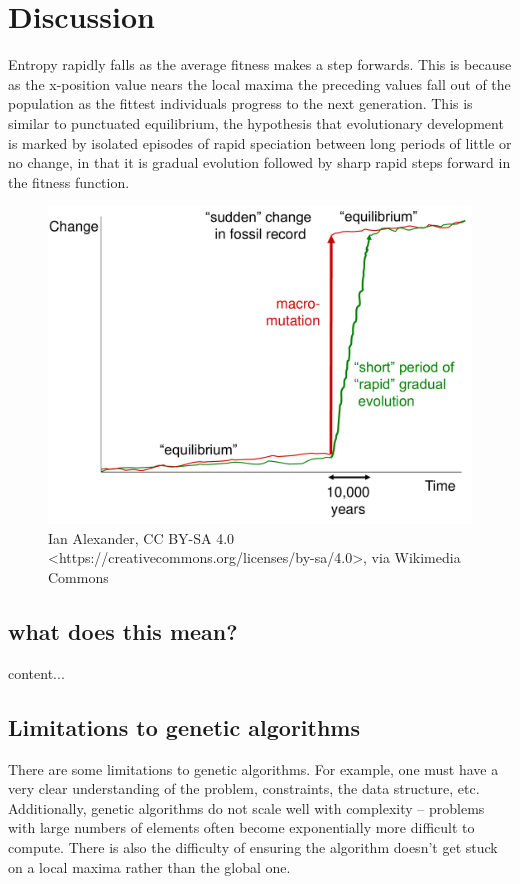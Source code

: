 \documentclass[11pt]{article}
\begin{document}
\section{Discussion}
\label{sec:org7999995}
Entropy rapidly falls as the average fitness makes a step forwards. This is because as the x-position value nears the local maxima the preceding values fall out of the population as the fittest individuals progress to the next generation. This is similar to punctuated equilibrium, the hypothesis that evolutionary development is marked by isolated episodes of rapid speciation between long periods of little or no change, in that it is gradual evolution followed by sharp rapid steps forward in the fitness function. 
\begin{figure}[h]
	\begin{center}
	\includegraphics[scale=0.25]{Punctuated_Equilibrium.pdf}
	\caption{
		\small Ian Alexander, CC BY-SA 4.0 <https://creativecommons.org/licenses/by-sa/4.0>, via Wikimedia Commons
	}
\end{center}
\end{figure}




\subsection{what does this mean?}
\label{sec:orgf7b36ed}
content...

\subsection{Limitations to genetic algorithms}
\label{sec:org148bf83}
There are some limitations to genetic algorithms. For example, one must
have a very clear understanding of the problem, constraints, the data
structure, etc. Additionally, genetic algorithms do not scale well with
complexity -- problems with large numbers of elements often become exponentially
more difficult to compute. There is also the difficulty of ensuring the
algorithm doesn't get stuck on a local maxima rather than the global one.
\end{document}
